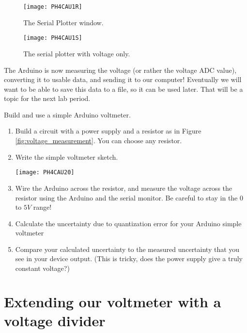 \begin{figure}[htbp!]
\centering
\texttt{[image: PH4CAU1R]}
\caption[The Serial Plotter window]{The Serial Plotter window.}
\label{fig:serial_plotter}
\end{figure}

\begin{figure}[htbp!]
\centering
\texttt{[image: PH4CAU1S]}
\caption[The serial plotter with voltage only]{The serial plotter with
voltage only.}
\label{fig:serial_plotter_2}
\end{figure}

The Arduino is now measuring the voltage (or rather the voltage ADC value),
converting it to usable data, and sending it to our computer! Eventually we will
want to be able to save this data to a file, so it can be used later. That will
be a topic for the next lab period.

\activity
{
Build and use a simple Arduino voltmeter.
\begin{enumerate}
\item Build a circuit with a power supply and a resistor as in 
	Figure \ref{fig:voltage_measurement}. You can choose any resistor. 

\item Write the simple voltmeter sketch.

\begin{center}
\texttt{[image: PH4CAU20]}
\end{center}
\item Wire the Arduino across the resistor, and measure the voltage 
	across the resistor using the Arduino and the serial monitor. 
	Be careful to stay in the $0$ to $5 \unit{V}$ range!

\item Calculate the uncertainty due to quantization error for your Arduino
simple voltmeter

\item Compare your calculated uncertainty to the measured uncertainty that
you see in your device output. (This is tricky, does the power supply give a
truly constant voltage?)
\end{enumerate}

}

\section{Extending our voltmeter with a voltage divider\label{Voltmeter with
Voltage Divider}}

